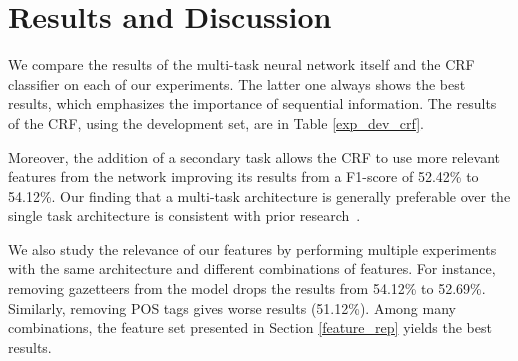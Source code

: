 \documentclass[11pt,letterpaper]{article}
\begin{document}
\begin{table}
\caption{\small \label{exp_dev_crf} This table shows the results from the CRF classifier at the class level. The classification is conducted using the development set as both validation and evaluation.}
\end{table}

\section{Results and Discussion}

We compare the results of the multi-task neural network itself and the CRF classifier on each of our experiments. The latter one always shows the best results, which emphasizes the importance of sequential information. The results of the CRF, using the development set, are in Table \ref{exp_dev_crf}.

Moreover, the addition of a secondary task allows the CRF to use more relevant features from the network improving its results from a F1-score of 52.42\% to 54.12\%. Our finding that a multi-task architecture is generally preferable over the single task  architecture is consistent with prior research~\cite{sogaard2016deep,collobert2008unified,attia-EtAl:2016:CogALex-V,maharjan-EtAl:2017:EACLlong}.

We also study the relevance of our features by performing multiple experiments with the same architecture and different combinations of features. For instance, removing gazetteers from the model drops the results from 54.12\% to 52.69\%. Similarly, removing POS tags gives worse results (51.12\%). Among many combinations, the feature set presented in Section \ref{feature_rep} yields the best results.
\end{document}
